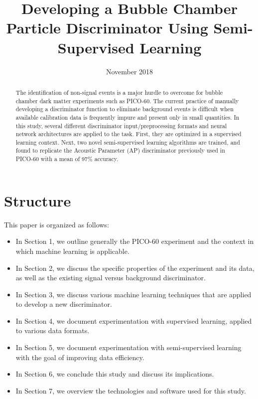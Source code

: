 \documentclass[10pt]{article}
\begin{document}
\title{Developing a Bubble Chamber Particle Discriminator Using Semi-Supervised Learning}

\date{November 2018}
\maketitle

\begin{abstract}
    The identification of non-signal events is a major hurdle to overcome for bubble chamber dark matter experiments such as PICO-60. The current practice of manually developing a discriminator function to eliminate background events is difficult when available calibration data is frequently impure and present only in small quantities. In this study, several different discriminator input/preprocessing formats and neural network architectures are applied to the task. First, they are optimized in a supervised learning context. Next, two novel semi-supervised learning algorithms are trained, and found to replicate the Acoustic Parameter (AP) discriminator previously used in PICO-60 with a mean of 97\% accuracy.
\end{abstract}

\pagebreak

\setcounter{section}{-1}

\section{Structure}

This paper is organized as follows:
\begin{itemize}
    \item In Section 1, we outline generally the PICO-60 experiment and the context in which machine learning is applicable.
    \item In Section 2, we discuss the specific properties of the experiment and its data, as well as the existing signal versus background discriminator.
    \item In Section 3, we discuss various machine learning techniques that are applied to develop a new discriminator.
    \item In Section 4, we document experimentation with supervised learning, applied to various data formats.
    \item In Section 5, we document experimentation with semi-supervised learning with the goal of improving data efficiency.
    \item In Section 6, we conclude this study and discuss its implications.
    \item In Section 7, we overview the technologies and software used for this study.
\end{itemize}
\end{document}
